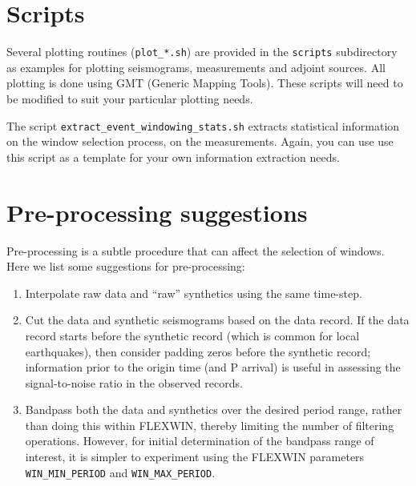 \section{Scripts}
Several plotting routines ({\tt plot\_*.sh}) are provided in the {\tt scripts} subdirectory as examples for plotting seismograms, measurements and adjoint sources.  All plotting is
done using GMT (Generic Mapping Tools).  These scripts will need to be modified to suit your particular plotting needs.

The script {\tt extract\_event\_windowing\_stats.sh} extracts statistical
information on the window selection process, on the measurements.  Again,
you can use use this script as a template for your own information
extraction needs.

\section{Pre-processing suggestions}

Pre-processing is a subtle procedure that can affect the selection of windows.
Here we list some suggestions for pre-processing:
%
\begin{enumerate}
\item Interpolate raw data and ``raw'' synthetics using the same time-step.

\item Cut the data and synthetic seismograms based on the data record.  If the data record starts before the synthetic record (which is common for local earthquakes), then consider padding zeros before the synthetic record; information prior to the origin time (and P arrival) is useful in assessing the signal-to-noise ratio in the observed records.

\item Bandpass both the data and synthetics over the desired period range, rather than doing this within FLEXWIN, thereby limiting the number of filtering operations.  However, for initial determination of the bandpass range of interest, it is simpler to experiment using the FLEXWIN parameters {\tt WIN\_MIN\_PERIOD} and {\tt WIN\_MAX\_PERIOD}.
\end{enumerate}

